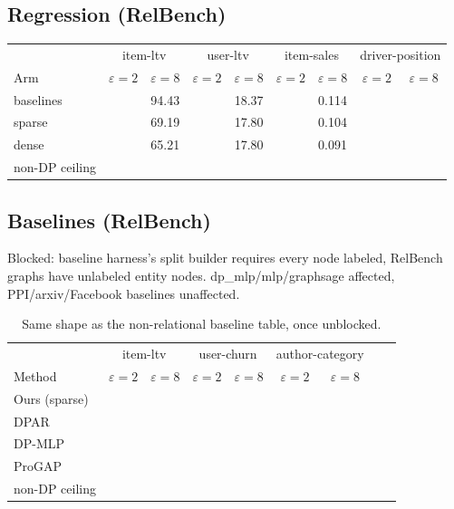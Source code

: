 \documentclass{article}
\begin{document}
\subsection{Regression (RelBench)}
\begin{table}[H]
  \centering\footnotesize
  \begin{tabular}{lcccccccc}
    \toprule
    & \multicolumn{2}{c}{item-ltv} & \multicolumn{2}{c}{user-ltv} & \multicolumn{2}{c}{item-sales} & \multicolumn{2}{c}{driver-position} \\
    Arm & $\varepsilon{=}2$ & $\varepsilon{=}8$ & $\varepsilon{=}2$ & $\varepsilon{=}8$ & $\varepsilon{=}2$ & $\varepsilon{=}8$ & $\varepsilon{=}2$ & $\varepsilon{=}8$ \\
    \midrule
    baselines & & 94.43 & & 18.37 & & 0.114 & & \\
    sparse & & 69.19 & & 17.80 & & 0.104 & & \\
    dense & & 65.21 & & 17.80 & & 0.091 & & \\
    \midrule
    non-DP ceiling & \multicolumn{2}{c}{} & \multicolumn{2}{c}{} & \multicolumn{2}{c}{} & \multicolumn{2}{c}{} \\
    \bottomrule
  \end{tabular}
\end{table}

\subsection{Baselines (RelBench)}
Blocked: baseline harness's split builder requires every node labeled,
RelBench graphs have unlabeled entity nodes. dp\_mlp/mlp/graphsage affected,
PPI/arxiv/Facebook baselines unaffected.

\begin{table}[H]
  \centering\footnotesize
  \caption{Same shape as the non-relational baseline table, once unblocked.}
  \begin{tabular}{lcccccccc}
    \toprule
    & \multicolumn{2}{c}{item-ltv} & \multicolumn{2}{c}{user-churn} & \multicolumn{2}{c}{author-category} & \multicolumn{2}{c}{} \\
    Method & $\varepsilon{=}2$ & $\varepsilon{=}8$ & $\varepsilon{=}2$ & $\varepsilon{=}8$ & $\varepsilon{=}2$ & $\varepsilon{=}8$ & & \\
    \midrule
    Ours (sparse) & & & & & & & & \\
    DPAR & & & & & & & & \\
    DP-MLP & & & & & & & & \\
    ProGAP & & & & & & & & \\
    \midrule
    non-DP ceiling & \multicolumn{2}{c}{} & \multicolumn{2}{c}{} & \multicolumn{2}{c}{} & & \\
    \bottomrule
  \end{tabular}
\end{table}
\end{document}
